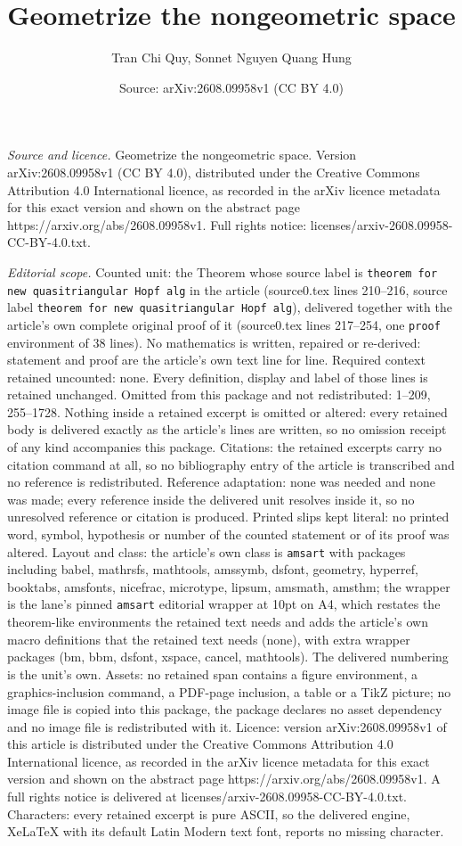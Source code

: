 \documentclass[10pt,a4paper]{amsart}
\title[Geometrize the nongeometric space]{Geometrize the nongeometric space}
\author{Tran Chi Quy, Sonnet Nguyen Quang Hung}
\date{Source: arXiv:2608.09958v1 (CC BY 4.0)}
\begin{document}
\maketitle

\noindent\emph{Source and licence.} Geometrize the nongeometric space. Version arXiv:2608.09958v1 (CC BY 4.0), distributed under the Creative Commons Attribution 4.0 International licence, as recorded in the arXiv licence metadata for this exact version and shown on the abstract page https://arxiv.org/abs/2608.09958v1. Full rights notice: licenses/arxiv-2608.09958-CC-BY-4.0.txt.\par\smallskip

\noindent\textit{Editorial scope.} Counted unit: the Theorem whose source label is \texttt{theorem for new quasitriangular Hopf alg} in the article (source0.tex lines 210--216, source label \texttt{theorem for new quasitriangular Hopf alg}), delivered together with the article's own complete original proof of it (source0.tex lines 217--254, one \texttt{proof} environment of 38 lines). No mathematics is written, repaired or re-derived: statement and proof are the article's own text line for line. Required context retained uncounted: none. Every definition, display and label of those lines is retained unchanged. Omitted from this package and not redistributed: 1--209, 255--1728. Nothing inside a retained excerpt is omitted or altered: every retained body is delivered exactly as the article's lines are written, so no omission receipt of any kind accompanies this package. Citations: the retained excerpts carry no citation command at all, so no bibliography entry of the article is transcribed and no reference is redistributed. Reference adaptation: none was needed and none was made; every reference inside the delivered unit resolves inside it, so no unresolved reference or citation is produced. Printed slips kept literal: no printed word, symbol, hypothesis or number of the counted statement or of its proof was altered. Layout and class: the article's own class is \texttt{amsart} with packages including babel, mathrsfs, mathtools, amssymb, dsfont, geometry, hyperref, booktabs, amsfonts, nicefrac, microtype, lipsum, amsmath, amsthm; the wrapper is the lane's pinned \texttt{amsart} editorial wrapper at 10pt on A4, which restates the theorem-like environments the retained text needs and adds the article's own macro definitions that the retained text needs (none), with extra wrapper packages (bm, bbm, dsfont, xspace, cancel, mathtools). The delivered numbering is the unit's own. Assets: no retained span contains a figure environment, a graphics-inclusion command, a PDF-page inclusion, a table or a TikZ picture; no image file is copied into this package, the package declares no asset dependency and no image file is redistributed with it. Licence: version arXiv:2608.09958v1 of this article is distributed under the Creative Commons Attribution 4.0 International licence, as recorded in the arXiv licence metadata for this exact version and shown on the abstract page https://arxiv.org/abs/2608.09958v1. A full rights notice is delivered at licenses/arxiv-2608.09958-CC-BY-4.0.txt. Characters: every retained excerpt is pure ASCII, so the delivered engine, XeLaTeX with its default Latin Modern text font, reports no missing character.
\end{document}
